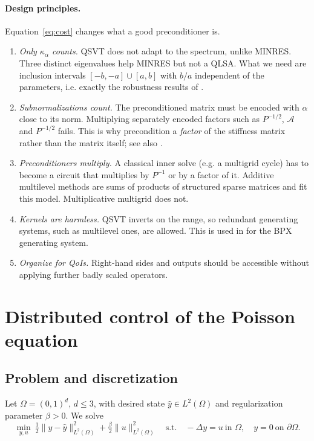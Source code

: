 \documentclass[11pt,a4paper]{article}
\newcommand{\A}{\mathcal{A}}
\theoremstyle{remark}
\begin{document}
\paragraph{Design principles.} Equation~\eqref{eq:cost} changes what a good
preconditioner is.
\begin{enumerate}
\item[(D1)] \emph{Only $\kappa_\alpha$ counts.} QSVT does not adapt to the spectrum,
  unlike MINRES. Three distinct eigenvalues help MINRES but not a QLSA.
  What we need are inclusion intervals $[-b,-a]\cup[a,b]$ with $b/a$
  independent of the parameters, i.e. exactly the robustness results of
  \cite{SZ07,PW12}.
\item[(D2)] \emph{Subnormalizations count.} The preconditioned matrix must be
  encoded with $\alpha$ close to its norm. Multiplying separately encoded
  factors such as $P^{-1/2}$, $\A$ and $P^{-1/2}$ fails. This is why
  \cite{DP26} precondition a \emph{factor} of the stiffness matrix rather than
  the matrix itself; see also \cite{LS25}.
\item[(D3)] \emph{Preconditioners multiply.} A classical inner solve
  (e.g. a multigrid cycle) has to become a circuit that multiplies by
  $P^{-1}$ or by a factor of it. Additive multilevel methods \cite{BPX90,Xu92}
  are sums of products of structured sparse matrices and fit this
  model. Multiplicative multigrid does not.
\item[(D4)] \emph{Kernels are harmless.} QSVT inverts on the range, so
  redundant generating systems, such as multilevel ones, are allowed. This
  is used in \cite{DP26} for the BPX generating system.
\item[(D5)] \emph{Organize for QoIs.} Right-hand sides and outputs should be
  accessible without applying further badly scaled operators.
\end{enumerate}

\section{Distributed control of the Poisson equation}\label{sec:poisson}

\subsection{Problem and discretization}

Let $\Omega=(0,1)^d$, $d\le3$, with desired state $\hat y\in L^2(\Omega)$ and
regularization parameter $\beta>0$. We solve
\begin{equation}\label{eq:ocp}
\min_{y,u}\ \tfrac12\|y-\hat y\|_{L^2(\Omega)}^2+\tfrac{\beta}{2}\|u\|_{L^2(\Omega)}^2
\quad\text{s.t.}\quad -\Delta y=u\ \text{in }\Omega,\quad y=0\ \text{on }\partial\Omega .
\end{equation}
\end{document}
